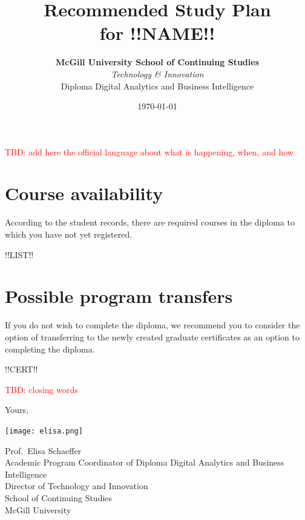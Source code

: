 \documentclass{article}
\title{Recommended Study Plan \\ for {\bf !!NAME!!}}
\date{\today}
\author{{\bf McGill University School of Continuing Studies} \\
  {\em Technology \& Innovation} \\
  Diploma Digital Analytics and Business Intelligence}
\begin{document}
\maketitle

\thispagestyle{fancy}

\textcolor{red}{TBD: add here the official language about what is happening, when, and how}

\section*{Course availability}

According to the student records, there are required courses in the
diploma to which you have not yet registered.

!!LIST!!

\newpage

\section*{Possible program transfers}

If you do not wish to complete the diploma, we recommend you to
consider the option of transferring to the newly created graduate
certificates as an option to completing the diploma.

!!CERT!!

\textcolor{red}{TBD: closing words}

Yours,

\hspace*{3mm}\texttt{[image: elisa.png]}

\vspace*{-7mm}
Prof.\ Elisa Schaeffer \\
Academic Program Coordinator of Diploma Digital Analytics and Business Intelligence \\
Director of Technology and Innovation \\
School of Continuing Studies \\
McGill University

\label{LastPage}
\end{document}
